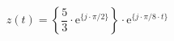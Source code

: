 \[
z(t) =  \left \{ \frac{5}{3} \cdot \textrm{e}^{\{ j \cdot \pi/2 \}} \right \} \cdot \textrm{e}^{\{ j \cdot \pi/8 \cdot t \}}
\]
